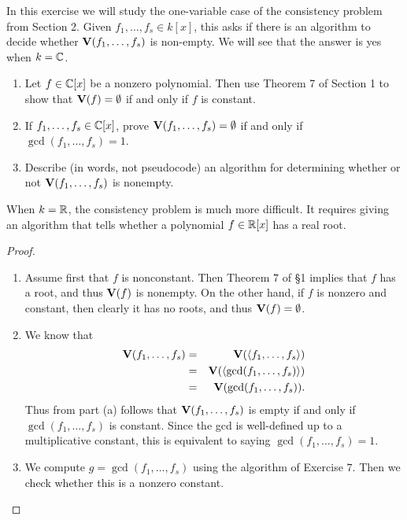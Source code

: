 \begin{exercise}{11}
In this exercise we will study the one-variable case of the consistency problem from Section 2. Given $f_1,\dots,f_s\in k[x]$, this asks if there is an algorithm to decide whether $\mathbf{V}(f_1,\dots,f_s)$ is non-empty. We will see that the answer is yes when $k=\mathbb{C}$.
\begin{enumerate}
    \item Let $f\in\mathbb{C}[x]$ be a nonzero polynomial. Then use Theorem 7 of Section 1 to show that $\mathbf{V}(f) =\emptyset$ if and only if $f$ is constant.
    \item If $f_1,\dots,f_s\in\mathbb{C}[x]$, prove $\mathbf{V}(f_1,\dots,f_s) =\emptyset$ if and only if $\gcd(f_1,\dots,f_s) =1$.
    \item Describe (in words, not pseudocode) an algorithm for determining whether or not $\mathbf{V}(f_1,\dots,f_s)$ is nonempty.
\end{enumerate}
When $k=\mathbb{R}$, the consistency problem is much more difficult. It requires giving an algorithm that tells whether a polynomial $f\in\mathbb{R}[x]$ has a real root.
\end{exercise}
\begin{proof}
\begin{enumerate}
    \item Assume first that $f$ is nonconstant. Then Theorem $7$ of \S 1 implies that $f$ has a root, and thus $\mathbf{V}(f)$ is nonempty. On the other hand, if $f$ is nonzero and constant, then clearly it has no roots, and thus $\mathbf{V}(f) = \emptyset$.
    \item We know that
    \begin{eqnarray*}
        \mathbf{V}(f_1,\dots,f_s)
        & = & \mathbf{V}(\langle f_1,\dots,f_s\rangle)\\
        & = & \mathbf{V}(\langle \gcd(f_1,\dots,f_s)\rangle)\\
        & = & \mathbf{V}(\gcd(f_1,\dots,f_s)).
    \end{eqnarray*}
    Thus from part (a) follows that $\mathbf{V}(f_1,\dots,f_s)$ is empty if and only if $\gcd(f_1,\dots,f_s)$ is constant. Since the gcd is well-defined up to a multiplicative constant, this is equivalent to saying $\gcd(f_1,\dots,f_s) = 1$.
    \item We compute $g = \gcd(f_1,\dots,f_s)$ using the algorithm of Exercise $7$. Then we check whether this is a nonzero constant.
\end{enumerate}
\end{proof}

